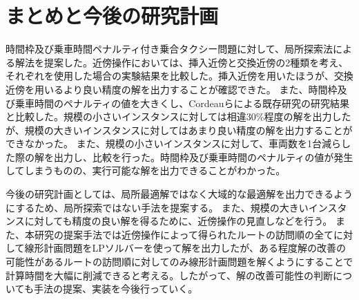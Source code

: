\chapter{まとめと今後の研究計画}\label{conclution}
時間枠及び乗車時間ペナルティ付き乗合タクシー問題に対して、局所探索法による解法を提案した。近傍操作においては、挿入近傍と交換近傍の2種類を考え、それぞれを使用した場合の実験結果を比較した。挿入近傍を用いたほうが、交換近傍を用いるより良い精度の解を出力することが確認できた。
また、時間枠及び乗車時間のペナルティの値を大きくし、Cordeauらによる既存研究の研究結果と比較した。規模の小さいインスタンスに対しては相違30\%程度の解を出力したが、規模の大きいインスタンスに対してはあまり良い精度の解を出力することができなかった。
また、規模の小さいインスタンスに対して、車両数を1台減らした際の解を出力し、比較を行った。時間枠及び乗車時間のペナルティの値が発生してしまうものの、実行可能な解を出力できることがわかった。

今後の研究計画としては、局所最適解ではなく大域的な最適解を出力できるようにするため、局所探索ではない手法を提案する。
また、規模の大きいインスタンスに対しても精度の良い解を得るために、近傍操作の見直しなどを行う。
また、本研究の提案手法では近傍操作によって得られたルートの訪問順の全てに対して線形計画問題をLPソルバーを使って解を出力したが、ある程度解の改善の可能性があるルートの訪問順に対してのみ線形計画問題を解くようにすることで計算時間を大幅に削減できると考える。したがって、解の改善可能性の判断についても手法の提案、実装を今後行っていく。
